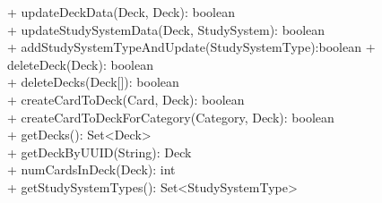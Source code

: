 {
    + updateDeckData(Deck, Deck): boolean \\
    + updateStudySystemData(Deck, StudySystem): boolean\\
    + addStudySystemTypeAndUpdate(StudySystemType):boolean
    + deleteDeck(Deck): boolean \\
    + deleteDecks(Deck[]): boolean \\
    + createCardToDeck(Card, Deck): boolean \\
    + createCardToDeckForCategory(Category, Deck): boolean \\
    + getDecks(): Set<Deck> \\
    + getDeckByUUID(String): Deck \\
    + numCardsInDeck(Deck): int\\
    + getStudySystemTypes(): Set<StudySystemType>
}{}
 